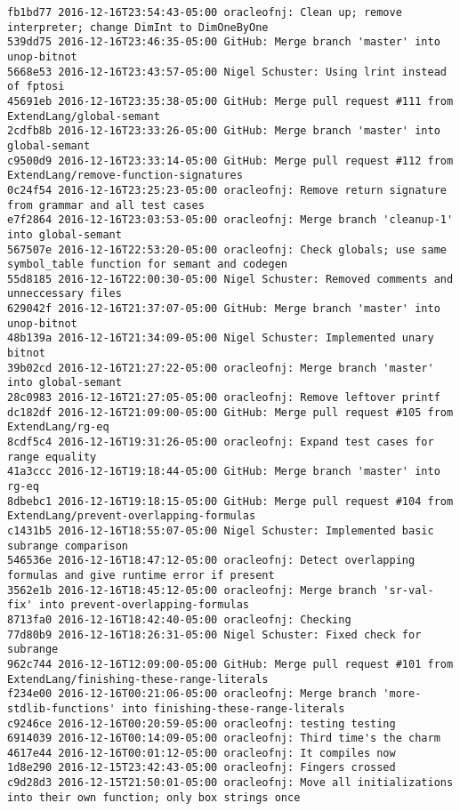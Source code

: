 \begin{lstlisting}
fb1bd77 2016-12-16T23:54:43-05:00 oracleofnj: Clean up; remove interpreter; change DimInt to DimOneByOne
539dd75 2016-12-16T23:46:35-05:00 GitHub: Merge branch 'master' into unop-bitnot
5668e53 2016-12-16T23:43:57-05:00 Nigel Schuster: Using lrint instead of fptosi
45691eb 2016-12-16T23:35:38-05:00 GitHub: Merge pull request #111 from ExtendLang/global-semant
2cdfb8b 2016-12-16T23:33:26-05:00 GitHub: Merge branch 'master' into global-semant
c9500d9 2016-12-16T23:33:14-05:00 GitHub: Merge pull request #112 from ExtendLang/remove-function-signatures
0c24f54 2016-12-16T23:25:23-05:00 oracleofnj: Remove return signature from grammar and all test cases
e7f2864 2016-12-16T23:03:53-05:00 oracleofnj: Merge branch 'cleanup-1' into global-semant
567507e 2016-12-16T22:53:20-05:00 oracleofnj: Check globals; use same symbol_table function for semant and codegen
55d8185 2016-12-16T22:00:30-05:00 Nigel Schuster: Removed comments and unneccessary files
629042f 2016-12-16T21:37:07-05:00 GitHub: Merge branch 'master' into unop-bitnot
48b139a 2016-12-16T21:34:09-05:00 Nigel Schuster: Implemented unary bitnot
39b02cd 2016-12-16T21:27:22-05:00 oracleofnj: Merge branch 'master' into global-semant
28c0983 2016-12-16T21:27:05-05:00 oracleofnj: Remove leftover printf
dc182df 2016-12-16T21:09:00-05:00 GitHub: Merge pull request #105 from ExtendLang/rg-eq
8cdf5c4 2016-12-16T19:31:26-05:00 oracleofnj: Expand test cases for range equality
41a3ccc 2016-12-16T19:18:44-05:00 GitHub: Merge branch 'master' into rg-eq
8dbebc1 2016-12-16T19:18:15-05:00 GitHub: Merge pull request #104 from ExtendLang/prevent-overlapping-formulas
c1431b5 2016-12-16T18:55:07-05:00 Nigel Schuster: Implemented basic subrange comparison
546536e 2016-12-16T18:47:12-05:00 oracleofnj: Detect overlapping formulas and give runtime error if present
3562e1b 2016-12-16T18:45:12-05:00 oracleofnj: Merge branch 'sr-val-fix' into prevent-overlapping-formulas
8713fa0 2016-12-16T18:42:40-05:00 oracleofnj: Checking
77d80b9 2016-12-16T18:26:31-05:00 Nigel Schuster: Fixed check for subrange
962c744 2016-12-16T12:09:00-05:00 GitHub: Merge pull request #101 from ExtendLang/finishing-these-range-literals
f234e00 2016-12-16T00:21:06-05:00 oracleofnj: Merge branch 'more-stdlib-functions' into finishing-these-range-literals
c9246ce 2016-12-16T00:20:59-05:00 oracleofnj: testing testing
6914039 2016-12-16T00:14:09-05:00 oracleofnj: Third time's the charm
4617e44 2016-12-16T00:01:12-05:00 oracleofnj: It compiles now
1d8e290 2016-12-15T23:42:43-05:00 oracleofnj: Fingers crossed
c9d28d3 2016-12-15T21:50:01-05:00 oracleofnj: Move all initializations into their own function; only box strings once

\end{lstlisting}
